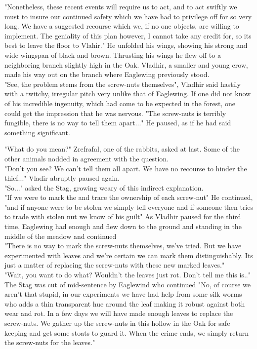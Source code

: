 \documentclass[smalldemyvopaper,11pt,twoside,onecolumn,openright,extrafontsizes]{memoir}
\begin{document}
"Nonetheless, these recent events will require us to act, and to act swiftly we must to insure our continued safety which we have had to privilege off for so very long. We have a suggested recourse which we, if no one objects, are willing to implement. The geniality of this plan however, I cannot take any credit for, so its best to leave the floor to Vlahir." He unfolded his wings, showing his strong and wide wingspan of black and brown. Thrusting his wings he flew off to a neighboring branch slightly high in the Oak. Vladhir, a smaller and young crow, made his way out on the branch where Eaglewing previously stood.\\

"See, the problem stems from the screw-nuts themselves", Vladhir said hastily with a twitchy, irregular pitch very unlike that of Eaglewing. If one did not know of his incredible ingenuity, which had come to be expected in the forest, one could get the impression that he was nervous. "The screw-nuts is terribly fungible, there is no way to tell them apart..." He paused, as if he had said something significant.  

"What do you mean?" Zrefrafal, one of the rabbits, asked at last. Some of the other animals nodded in agreement with the question.\\

"Don't you see? We can't tell them all apart. We have no recourse to hinder the thief..." Vladir abruptly paused again.\\

"So..." asked the Stag, growing weary of this indirect explanation.\\

"If we were to mark the and trace the ownership of each screw-nut" He continued, "and if anyone were to be stolen we simply tell everyone and if someone then tries to trade with stolen nut we know of his guilt" As Vladhir paused for the third time, Eaglewing had enough and flew down to the ground and standing in the middle of the meadow and continued \\

"There is no way to mark the screw-nuts themselves, we've tried. But we have experimented with leaves and we're certain we can mark them distinguishably. Its just a matter of replacing the screw-nuts with these new marked leaves."\\

"Wait, you want to do what? Wouldn't the leaves just rot. Don't tell me this is.." The Stag was cut of mid-sentence by Eaglewind who continued
"No, of course we aren't that stupid, in our experiments we have had help from some silk worms who adds a thin transparent hue around the leaf making it robust against both wear and rot. In a few days we will have made enough leaves to replace the screw-nuts. We gather up the screw-nuts in this hollow in the Oak for safe keeping and get some stoats to guard it. When the crime ends, we simply return the screw-nuts for the leaves."\\
\end{document}
